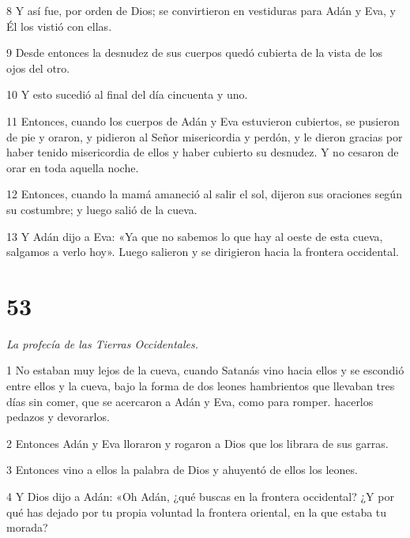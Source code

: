 \par 8 Y así fue, por orden de Dios; se convirtieron en vestiduras para Adán y Eva, y Él los vistió con ellas.

\par 9 Desde entonces la desnudez de sus cuerpos quedó cubierta de la vista de los ojos del otro.

\par 10 Y esto sucedió al final del día cincuenta y uno.

\par 11 Entonces, cuando los cuerpos de Adán y Eva estuvieron cubiertos, se pusieron de pie y oraron, y pidieron al Señor misericordia y perdón, y le dieron gracias por haber tenido misericordia de ellos y haber cubierto su desnudez. Y no cesaron de orar en toda aquella noche.

\par 12 Entonces, cuando la mamá amaneció al salir el sol, dijeron sus oraciones según su costumbre; y luego salió de la cueva.

\par 13 Y Adán dijo a Eva: «Ya que no sabemos lo que hay al oeste de esta cueva, salgamos a verlo hoy». Luego salieron y se dirigieron hacia la frontera occidental.



\chapter{53}

\par \textit{La profecía de las Tierras Occidentales.}

\par 1 No estaban muy lejos de la cueva, cuando Satanás vino hacia ellos y se escondió entre ellos y la cueva, bajo la forma de dos leones hambrientos que llevaban tres días sin comer, que se acercaron a Adán y Eva, como para romper. hacerlos pedazos y devorarlos.

\par 2 Entonces Adán y Eva lloraron y rogaron a Dios que los librara de sus garras.

\par 3 Entonces vino a ellos la palabra de Dios y ahuyentó de ellos los leones.

\par 4 Y Dios dijo a Adán: «Oh Adán, ¿qué buscas en la frontera occidental? ¿Y por qué has dejado por tu propia voluntad la frontera oriental, en la que estaba tu morada?

